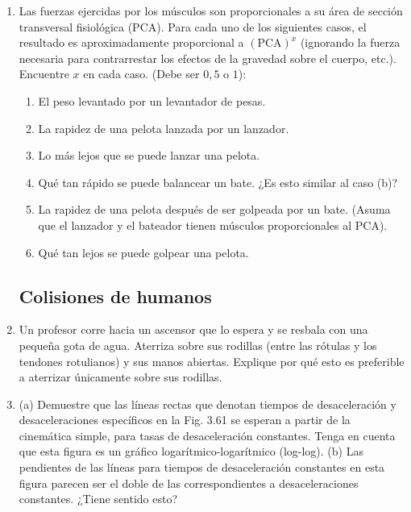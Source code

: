 \documentclass[12pt]{book}
\begin{document}
\begin{enumerate}
\item[3.128] Las fuerzas ejercidas por los músculos son proporcionales a su área de sección transversal fisiológica ($\text{PCA}$). Para cada uno de los siguientes casos, el resultado es aproximadamente proporcional a $(\text{PCA})^x$ (ignorando la fuerza necesaria para contrarrestar los efectos de la gravedad sobre el cuerpo, etc.). Encuentre $x$ en cada caso. (Debe ser $0{,}5$ o $1$):
\begin{enumerate}
\item[(a)] El peso levantado por un levantador de pesas.
\item[(b)] La rapidez de una pelota lanzada por un lanzador.
\item[(c)] Lo más lejos que se puede lanzar una pelota.
\item[(d)] Qué tan rápido se puede balancear un bate. ¿Es esto similar al caso (b)?
\item[(e)] La rapidez de una pelota después de ser golpeada por un bate. (Asuma que el lanzador y el bateador tienen músculos proporcionales al $\text{PCA}$).
\item[(f)] Qué tan lejos se puede golpear una pelota.
\end{enumerate}

\subsection*{Colisiones de humanos}

\item[3.129] Un profesor corre hacia un ascensor que lo espera y se resbala con una pequeña gota de agua. Aterriza sobre sus rodillas (entre las rótulas y los tendones rotulianos) y sus manos abiertas. Explique por qué esto es preferible a aterrizar únicamente sobre sus rodillas.

\item[3.130] (a) Demuestre que las líneas rectas que denotan tiempos de desaceleración y desaceleraciones específicos en la Fig. 3.61 se esperan a partir de la cinemática simple, para tasas de desaceleración constantes. Tenga en cuenta que esta figura es un gráfico logarítmico-logarítmico (log-log).
\newline
(b) Las pendientes de las líneas para tiempos de desaceleración constantes en esta figura parecen ser el doble de las correspondientes a desaceleraciones constantes. ¿Tiene sentido esto?


\end{enumerate}
\end{document}
